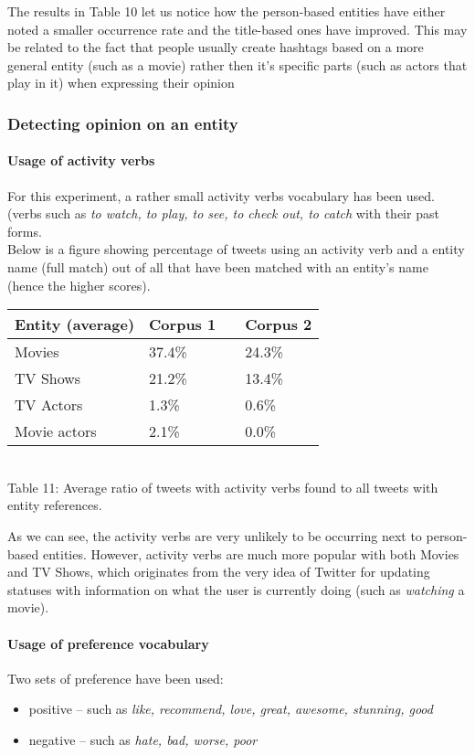 The results in Table 10 let us notice how the person-based entities have either noted a smaller
occurrence rate and the title-based ones have improved. This may be related to the
fact that people usually create hashtags based on a more general entity (such as
a movie) rather then it's specific parts (such as actors that play in it)
when expressing their opinion \cite{edinburg-corpus}

\subsubsection{Detecting opinion on an entity}
\paragraph{Usage of activity verbs}
For this experiment, a rather small activity verbs vocabulary has been used. (verbs such
as \textit{to watch, to play, to see, to check out, to catch} with their past forms.
\\ Below is a figure showing percentage of tweets using an activity verb
and a entity name (full match) out of all that have been matched with an
entity's name (hence the higher scores).

\begin{center}
  \begin{tabular}{ | p{4cm} | p{2cm} | p{1cm}| p{2cm} | } \hline
    Entity (average) & Corpus 1 & & Corpus 2 \\ \hline
    Movies & 37.4\% & & 24.3\% \\ \hline
    TV Shows & 21.2\% & & 13.4\% \\ \hline
    TV Actors & 1.3\% & & 0.6\% \\ \hline
    Movie actors & 2.1\% & & 0.0\% \\ \hline
  \end{tabular} \\
  Table 11: Average ratio of tweets with activity verbs found to all tweets with entity references. \\
\end{center}

As we can see, the activity verbs are very unlikely to be occurring next to
person-based entities. However, activity verbs are much more popular with both
Movies and TV Shows, which originates from the very idea of Twitter for
updating statuses with information on what the user is currently doing (such as \textit{watching}
a movie).

\paragraph{Usage of preference vocabulary}
Two sets of preference have been used:
\begin{itemize}
  \item positive -- such as \textit{like, recommend, love, great, awesome, stunning, good}
  \item negative -- such as \textit{hate, bad, worse, poor}
\end{itemize}

